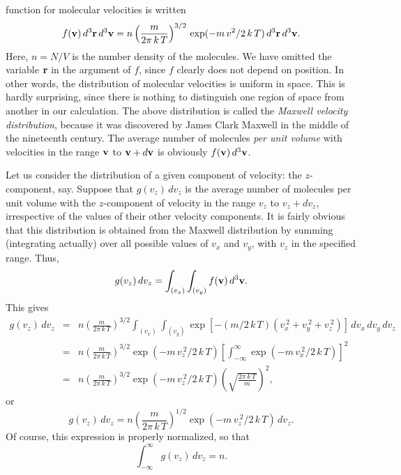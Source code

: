 function for molecular velocities is written
\begin{equation}
f({\bf v}) \,d^3{\bf r}\,d^3{\bf v} = n \left(\frac{m}{2\pi \,k \,T}\right)^{3/2}
\, \exp(-m \,v^2/ 2\,k\,T)\, d^3{\bf r}\,d^3{\bf v}.\label{e7.176}
\end{equation}
Here, $n=N/V$ is the number density of the molecules. We
 have omitted the variable ${\bf r}$ in the argument of $f$, since
$f$ clearly does not depend on position. In other words, the distribution of
molecular velocities is uniform in space. This is hardly surprising, since there
is nothing to distinguish one region of space from another in our calculation.
The above distribution is called the {\em Maxwell velocity  distribution}, 
because it was discovered by James Clark Maxwell in the middle of the nineteenth century.
The average number of molecules {\em per unit volume} with velocities in the
range ${\bf v}$ to ${\bf v} + d{\bf v}$ is obviously
$f({\bf v}) \,d^3{\bf v}$.

Let us consider the distribution of a given component of velocity: the $z$-component,
say. Suppose that $g(v_z)\,dv_z$ is the average number of molecules per unit volume
with the $z$-component of velocity in the range $v_z$ to $v_z+dv_z$, irrespective
of the values of their other velocity components. It is fairly obvious that
this distribution is obtained from the Maxwell distribution by summing (integrating
actually) over all possible values of $v_x$ and $v_y$, with $v_z$ in the specified
range. Thus,
\begin{equation}
g(v_z)\,dv_z = \int_{(v_x)} \int_{(v_y)} f({\bf v})\,d^3{\bf v}.
\end{equation}
This gives
\begin{eqnarray}
g(v_z)\,dv_z& = &n \left(\frac{m}{2\pi\, k\,T}\right)^{3/2}  
 \int_{(v_x)} \int_{(v_y)} \exp[- (m/2\, k\,T)(v_x^{~2}+v_y^{~2}+v_z^{~2})]\,
dv_x\,dv_y\, dv_z
\nonumber\\[0.5ex]
&=&n \left(\frac{m}{2\pi \,k\,T}\right)^{3/2} \exp(-m\,v_z^{~2}/ 2\,k\,T)
\left[\int_{-\infty}^{\infty} \exp(-m\,v_x^{~2}/ 2\,k\,T)\right]^2\nonumber\\[0.5ex]
&=&n \left(\frac{m}{2\pi \,k\,T}\right)^{3/2}\exp(-m\,v_z^{~2}/ 2\,k\,T)
\left(\sqrt{\frac{2\pi\,k\,T}{m}}\right)^2,
\end{eqnarray}
or
\begin{equation}
g(v_z)\,dv_z = n \left(\frac{m}{2\pi \,k\,T} \right)^{1/2} \exp(-m\, v_z^{~2}/2\,k\,T)\,
dv_z.
\end{equation}
Of course, this expression is properly normalized, so that
\begin{equation}
\int_{-\infty}^{\infty} g(v_z)\, dv_z = n.
\end{equation}

